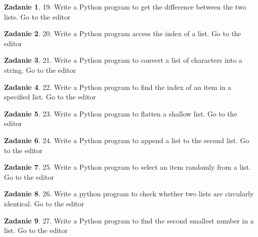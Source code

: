 \documentclass[11pt]{article}
\theoremstyle{definition}
\newtheorem{zadanie}{Zadanie}
\begin{document}
\begin{zadanie}


19. Write a Python program to get the difference between the two lists. Go to the editor


\end{zadanie}

\begin{zadanie}


20. Write a Python program access the index of a list. Go to the editor


\end{zadanie}

\begin{zadanie}


21. Write a Python program to convert a list of characters into a string. Go to the editor


\end{zadanie}

\begin{zadanie}


22. Write a Python program to find the index of an item in a specified list. Go to the editor


\end{zadanie}

\begin{zadanie}


23. Write a Python program to flatten a shallow list. Go to the editor


\end{zadanie}

\begin{zadanie}


24. Write a Python program to append a list to the second list. Go to the editor


\end{zadanie}

\begin{zadanie}


25. Write a Python program to select an item randomly from a list. Go to the editor


\end{zadanie}

\begin{zadanie}


26. Write a python program to check whether two lists are circularly identical. Go to the editor


\end{zadanie}

\begin{zadanie}


27. Write a Python program to find the second smallest number in a list. Go to the editor


\end{zadanie}
\end{document}
